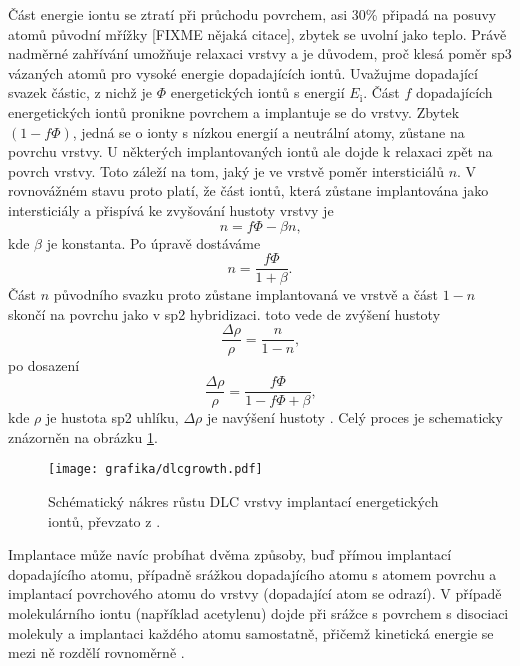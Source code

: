 Část energie iontu se ztratí při průchodu povrchem, asi 30\% připadá na posuvy atomů původní mřížky [FIXME nějaká citace], zbytek se uvolní jako teplo. Právě nadměrné zahřívání umožňuje relaxaci vrstvy a je důvodem, proč klesá poměr sp3 vázaných atomů pro vysoké energie dopadajících iontů. Uvažujme dopadající svazek částic, z nichž je $\Phi$ energetických iontů s energií $E_\mathrm{i}$. Část $f$ dopadajících energetických iontů pronikne povrchem a implantuje se do vrstvy. Zbytek $(1-f \Phi)$, jedná se o ionty s nízkou energií a neutrální atomy, zůstane na povrchu vrstvy. U některých implantovaných iontů ale dojde k relaxaci zpět na povrch vrstvy. Toto záleží na tom, jaký je ve vrstvě poměr intersticiálů $n$. V rovnovážném stavu proto platí, že část iontů, která zůstane implantována jako intersticiály a přispívá ke zvyšování hustoty vrstvy je 
\begin{equation}
n = f \Phi - \beta n \text{,}
\end{equation}
kde $\beta$ je konstanta. Po úpravě dostáváme
\begin{equation}
n = \frac{f \Phi}{1 + \beta} \text{.}
\end{equation} 
Část $n$ původního svazku proto zůstane implantovaná ve vrstvě a část $1-n$ skončí na povrchu jako v sp2 hybridizaci. toto vede de zvýšení hustoty
\begin{equation}
\frac{\Delta \rho}{\rho} = \frac{n}{1-n} \text{,}
\end{equation}  
po dosazení
\begin{equation}
\frac{\Delta \rho}{\rho} = \frac{f \Phi}{1 - f \Phi + \beta} \text{,}
\end{equation}
kde $\rho$ je hustota sp2 uhlíku, $\Delta \rho$ je navýšení hustoty \cite{Robertson1994}. Celý proces je schematicky znázorněn na obrázku \ref{dlcgrowth}.

\begin{figure}[htbp]
  \centering
  \texttt{[image: grafika/dlcgrowth.pdf]}
  \caption{Schématický nákres růstu DLC vrstvy implantací energetických iontů, převzato z \cite{Robertson2002}.}
  \label{dlcgrowth}
\end{figure}

Implantace může navíc probíhat dvěma způsoby, buď přímou implantací dopadajícího atomu, případně srážkou dopadajícího atomu s atomem povrchu a implantací povrchového atomu do vrstvy (dopadající atom se odrazí). V případě molekulárního iontu (například acetylenu) dojde při srážce s povrchem s disociaci molekuly a implantaci každého atomu samostatně, přičemž kinetická energie se mezi ně rozdělí rovnoměrně \cite{Robertson2002}.

